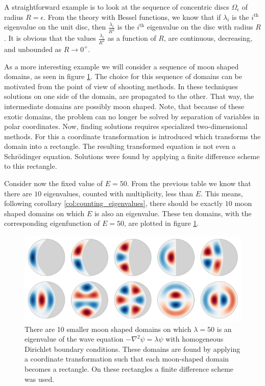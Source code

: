 A straightforward example is to look at the sequence of concentric discs $\Omega_\epsilon$ of radius $R = \epsilon$. From the theory with Bessel functions, we know that if $\lambda_{i}$ is the $i^\text{th}$ eigenvalue on the unit disc, then $\frac{\lambda_{i}}{R^2}$ is the $i^\text{th}$ eigenvalue on the disc with radius $R$. It is obvious that the values $\frac{\lambda_{i}}{R^2}$ as a function of $R$, are continuous, decreasing, and unbounded as $R \to 0^{+}$.

As a more interesting example we will consider a sequence of moon shaped domains, as seen in figure \ref{fig:waves_on_disc}. The choice for this sequence of domains can be motivated from the point of view of shooting methods. In these techniques solutions on one side of the domain, are propagated to the other. That way, the intermediate domains are possibly moon shaped. Note, that because of these exotic domains, the problem can no longer be solved by separation of variables in polar coordinates. Now, finding solutions requires specialized two-dimensional methods. For this a coordinate transformation is introduced which transforms the domain into a rectangle. The resulting transformed equation is not even a Schrödinger equation. Solutions were found by applying a finite difference scheme to this rectangle.

Consider now the fixed value of $E = 50$. From the previous table we know that there are $10$ eigenvalues, counted with multiplicity, less than $E$. This means, following corollary \ref{col:counting_eigenvalues}, there should be exactly $10$ moon shaped domains on which $E$ is also an eigenvalue. These ten domains, with the corresponding eigenfunction of $E = 50$, are plotted in figure \ref{fig:waves_on_disc}.

\begin{figure}
  \begin{center}
    \includegraphics[width=1\textwidth]{img/chapter3/counting/disc.pdf}
    \caption{\label{fig:waves_on_disc} There are 10 smaller moon shaped domains on which $\lambda = 50$ is an eigenvalue of the wave equation $-\nabla^2 \psi = \lambda \psi$ with homogeneous Dirichlet boundary conditions. These domains are found by applying a coordinate transformation such that each moon-shaped domain becomes a rectangle. On these rectangles a finite difference scheme was used.}
  \end{center}
\end{figure}

